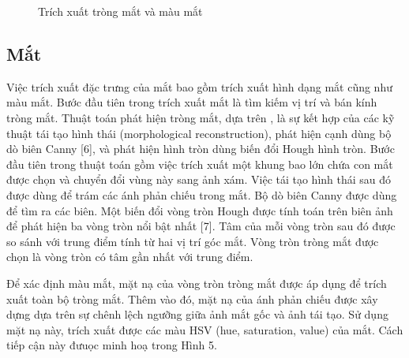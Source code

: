 \documentclass[journal]{IEEEtran}
\begin{document}
\begin{figure}[!t]
\caption{Trích xuất tròng mắt và màu mắt}
\label{refhinh5}
\end{figure}

\subsection{Mắt}

Việc trích xuất đặc trưng của mắt bao gồm trích xuất hình dạng mắt cũng như màu mắt. Bước đầu tiên trong trích xuất mắt là tìm kiếm vị trí và bán kính tròng mắt. Thuật toán phát hiện tròng mắt, dựa trên \cite{ref:r4}, là sự kết hợp của các kỹ thuật tái tạo hình thái (morphological reconstruction), phát hiện cạnh dùng bộ dò biên Canny [6], và phát hiện hình tròn dùng biến đổi Hough hình tròn. Bước đầu tiên trong thuật toán gồm việc trích xuất một khung bao lớn chứa con mắt được chọn và chuyển đổi vùng này sang ảnh xám. Việc tái tạo hình thái sau đó được dùng để trám các ánh phản chiếu trong mắt. Bộ dò biên Canny được dùng để tìm ra các biên. Một biến đổi vòng tròn Hough được tính toán trên biên ảnh để phát hiện ba vòng tròn nổi bật nhất [7]. Tâm của mỗi vòng tròn sau đó được so sánh với trung điểm tính từ hai vị trí góc mắt. Vòng tròn tròng mắt được chọn là vòng tròn có tâm gần nhất với trung điểm.

Để xác định màu mắt, mặt nạ của vòng tròn tròng mắt được áp dụng để trích xuất toàn bộ tròng mắt. Thêm vào đó, mặt nạ của ánh phản chiếu được xây dựng dựa trên sự chênh lệch ngưỡng giữa ảnh mắt gốc và ảnh tái tạo. Sử dụng mặt nạ này, trích xuất được các màu HSV (hue, saturation, value) của mắt. Cách tiếp cận này đưuọc minh hoạ trong Hình 5.
\end{document}
